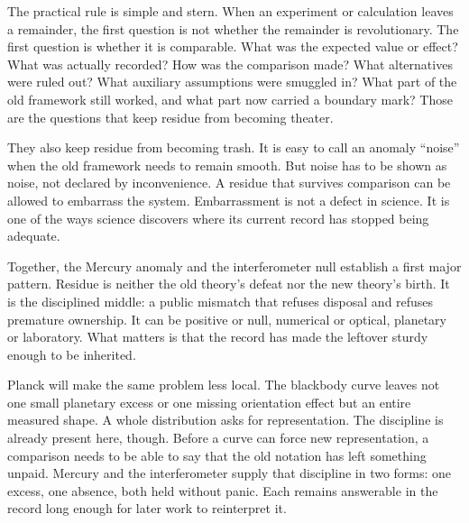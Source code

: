 The practical rule is simple and stern. When an experiment or calculation
leaves a remainder, the first question is not whether the remainder is
revolutionary. The first question is whether it is comparable. What was
the expected value or effect? What was actually recorded? How was the
comparison made? What alternatives were ruled out? What auxiliary
assumptions were smuggled in? What part of the old framework still
worked, and what part now carried a boundary mark? Those are the questions
that keep residue from becoming theater.

They also keep residue from becoming trash. It is easy to call an anomaly
``noise'' when the old framework needs to remain smooth. But noise has to
be shown as noise, not declared by inconvenience. A residue that survives
comparison can be allowed to embarrass the system. Embarrassment is not a
defect in science. It is one of the ways science discovers where its
current record has stopped being adequate.

Together, the Mercury anomaly and the interferometer null establish a
first major pattern. Residue is neither the old theory's defeat nor the
new theory's birth. It is the disciplined middle: a public mismatch that
refuses disposal and refuses premature ownership. It can be positive or
null, numerical or optical, planetary or laboratory. What matters is that
the record has made the leftover sturdy enough to be inherited.

Planck will make the same problem less local. The blackbody curve leaves
not one small planetary excess or one missing orientation effect but an
entire measured shape. A whole distribution asks for representation. The
discipline is already present here, though. Before a curve can force new
representation, a comparison needs to be able to say that the old notation
has left something unpaid. Mercury and the interferometer supply that
discipline in two forms: one excess, one absence, both held without
panic. Each remains answerable in the record long enough for later work
to reinterpret it.

